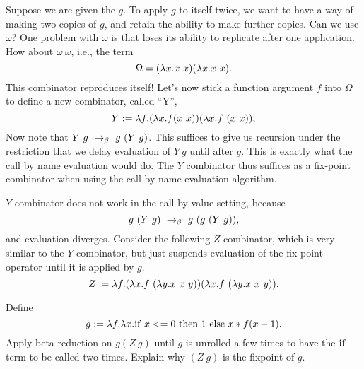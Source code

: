 \begin{gram}[$Y$ Combinator]
Suppose we are given the
$g$.  To apply $g$ to itself twice, we want to have a way of
making two copies of $g$, and retain the ability to make further
copies. Can we use $\omega$? 
%
One problem with $\omega$ is that loses
its ability to replicate after one application.  How about
$\omega~\omega$, i.e., the term 
\[
\Omega = (\lambda x. x~x) (\lambda x. x~x).  
\]
This combinator reproduces itself!  
%
Let's now stick a
function argument $f$ into $\Omega$ to define a new combinator, called ``Y'',
\[
Y := \lambda f.  (\lambda x. f (x~  x)) (\lambda x. f~ (x~ x)),
\]
%
Now note that $Y~ g ~\rightarrow_{\beta}~ g~ (Y~ g)$. 
%
This suffices to give us
recursion under the restriction that we delay evaluation of $Y~ g$
until after $g$.  This is exactly what the call by name evaluation
would do.  The $Y$ combinator thus suffices as a fix-point
combinator when using the call-by-name evaluation algorithm.
\end{gram}

\begin{gram}[$Z$ Combinator]
$Y$ combinator does not work in the call-by-value setting, because
\[
g~ (Y~ g) ~\rightarrow_{\beta}~ g~ ( g~ (Y~ g)),
\]
and  evaluation diverges.  
%
Consider the following $Z$ combinator, which is very similar
to the $Y$ combinator, but just suspends evaluation of the fix point
operator until it is applied by $g$.  
%
\[
Z :=  \lambda f. (\lambda x. f~ (\lambda y. x~ x~ y)) (\lambda x. f~ (\lambda y. x~ x~ y)).
\]
\end{gram}

\begin{exercise}
Define 
\[
g := \lambda f. \lambda x.  \mathrm{if}~x <= 0~\mathrm{then}~1~\mathrm{else}~x*f
      (x-1).
\]
%
Apply beta reduction on $g (Z~ g)$ until $g$ is unrolled a few times
to have the $\mathrm{if}$ term to be called two times.  Explain why $(Z~ g)$
is the fixpoint of $g$.  
\end{exercise}


